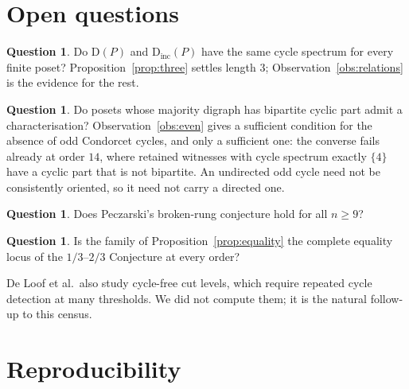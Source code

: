 \documentclass[11pt]{article}
\theoremstyle{definition}
\newtheorem{question}[theorem]{Question}
\newcommand{\Dig}{\mathrm{D}}
\begin{document}
\section{Open questions}\label{sec:open}

\begin{question}\label{q:relations}
Do $\Dig(P)$ and $\Dig_{\mathrm{inc}}(P)$ have the same cycle spectrum for
every finite poset?  Proposition~\ref{prop:three} settles length $3$;
Observation~\ref{obs:relations} is the evidence for the rest.
\end{question}

\begin{question}
Do posets whose majority digraph has bipartite cyclic part admit a
characterisation?  Observation~\ref{obs:even} gives a sufficient condition for
the absence of odd Condorcet cycles, and only a sufficient one: the converse
fails already at order $14$, where retained witnesses with cycle spectrum
exactly $\{4\}$ have a cyclic part that is not bipartite.  An undirected odd
cycle need not be consistently oriented, so it need not carry a directed one.
\end{question}

\begin{question}
Does Peczarski's broken-rung conjecture hold for all $n\geq9$?
\end{question}

\begin{question}
Is the family of Proposition~\ref{prop:equality} the complete equality locus
of the $1/3$--$2/3$ Conjecture at every order?
\end{question}

De Loof et al.\ also study cycle-free cut levels, which require repeated cycle
detection at many thresholds.  We did not compute them; it is the natural
follow-up to this census.

\section{Reproducibility}
\end{document}
